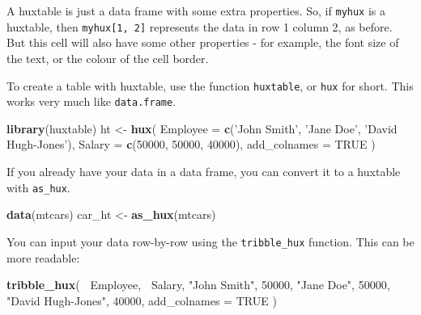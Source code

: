 \documentclass[]{article}
\newenvironment{Shaded}{\begin{snugshade}}{\end{snugshade}}
\newcommand{\DataTypeTok}[1]{\textcolor[rgb]{0.13,0.29,0.53}{#1}}
\newcommand{\DecValTok}[1]{\textcolor[rgb]{0.00,0.00,0.81}{#1}}
\newcommand{\KeywordTok}[1]{\textcolor[rgb]{0.13,0.29,0.53}{\textbf{#1}}}
\newcommand{\NormalTok}[1]{#1}
\newcommand{\OperatorTok}[1]{\textcolor[rgb]{0.81,0.36,0.00}{\textbf{#1}}}
\newcommand{\OtherTok}[1]{\textcolor[rgb]{0.56,0.35,0.01}{#1}}
\newcommand{\StringTok}[1]{\textcolor[rgb]{0.31,0.60,0.02}{#1}}
\begin{document}
A huxtable is just a data frame with some extra properties. So, if
\texttt{myhux} is a huxtable, then \texttt{myhux{[}1,\ 2{]}} represents
the data in row 1 column 2, as before. But this cell will also have some
other properties - for example, the font size of the text, or the colour
of the cell border.

To create a table with huxtable, use the function \texttt{huxtable}, or
\texttt{hux} for short. This works very much like \texttt{data.frame}.

\begin{Shaded}
\begin{Highlighting}[]
\KeywordTok{library}\NormalTok{(huxtable)}
\NormalTok{ht <-}\StringTok{ }\KeywordTok{hux}\NormalTok{(}
        \DataTypeTok{Employee     =} \KeywordTok{c}\NormalTok{(}\StringTok{'John Smith'}\NormalTok{, }\StringTok{'Jane Doe'}\NormalTok{, }\StringTok{'David Hugh-Jones'}\NormalTok{), }
        \DataTypeTok{Salary       =} \KeywordTok{c}\NormalTok{(}\DecValTok{50000}\NormalTok{, }\DecValTok{50000}\NormalTok{, }\DecValTok{40000}\NormalTok{),}
        \DataTypeTok{add_colnames =} \OtherTok{TRUE}
\NormalTok{      )}
\end{Highlighting}
\end{Shaded}

\FloatBarrier

If you already have your data in a data frame, you can convert it to a
huxtable with \texttt{as\_hux}.

\begin{Shaded}
\begin{Highlighting}[]
\KeywordTok{data}\NormalTok{(mtcars)}
\NormalTok{car_ht <-}\StringTok{ }\KeywordTok{as_hux}\NormalTok{(mtcars)}
\end{Highlighting}
\end{Shaded}

\FloatBarrier

You can input your data row-by-row using the \texttt{tribble\_hux}
function. This can be more readable:

\begin{Shaded}
\begin{Highlighting}[]
\KeywordTok{tribble_hux}\NormalTok{(}
  \OperatorTok{~}\NormalTok{Employee,          }\OperatorTok{~}\NormalTok{Salary,}
  \StringTok{"John Smith"}\NormalTok{,       }\DecValTok{50000}\NormalTok{,}
  \StringTok{"Jane Doe"}\NormalTok{,         }\DecValTok{50000}\NormalTok{,}
  \StringTok{"David Hugh-Jones"}\NormalTok{, }\DecValTok{40000}\NormalTok{,}
  \DataTypeTok{add_colnames =} \OtherTok{TRUE}
\NormalTok{)}
\end{Highlighting}
\end{Shaded}
\end{document}
